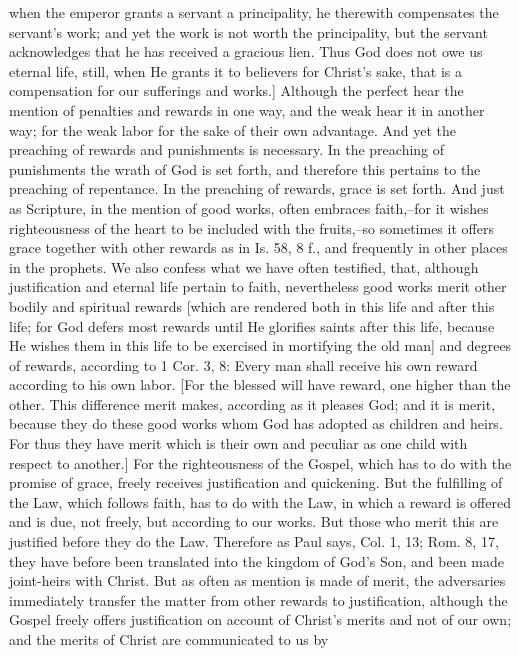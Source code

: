 when the emperor grants a servant a principality, he therewith
compensates the servant's work; and yet the work is not worth the
principality, but the servant acknowledges that he has received a
gracious lien.  Thus God does not owe us eternal life, still, when He
grants it to believers for Christ's sake, that is a compensation for
our sufferings and works.] Although the perfect hear the mention of
penalties and rewards in one way, and the weak hear it in another way;
for the weak labor for the sake of their own advantage.  And yet the
preaching of rewards and punishments is necessary.  In the preaching
of punishments the wrath of God is set forth, and therefore this
pertains to the preaching of repentance.  In the preaching of rewards,
grace is set forth.  And just as Scripture, in the mention of good
works, often embraces faith,--for it wishes righteousness of the
heart to be included with the fruits,--so sometimes it offers grace
together with other rewards as in Is. 58, 8 f., and frequently in
other places in the prophets.  We also confess what we have often
testified, that, although justification and eternal life pertain to
faith, nevertheless good works merit other bodily and spiritual
rewards [which are rendered both in this life and after this life;
for God defers most rewards until He glorifies saints after this life,
because He wishes them in this life to be exercised in mortifying
the old man] and degrees of rewards, according to 1 Cor. 3, 8: Every
man shall receive his own reward according to his own labor.  [For
the blessed will have reward, one higher than the other.  This
difference merit makes, according as it pleases God; and it is merit,
because they do these good works whom God has adopted as children and
heirs.  For thus they have merit which is their own and peculiar as
one child with respect to another.] For the righteousness of the
Gospel, which has to do with the promise of grace, freely receives
justification and quickening.  But the fulfilling of the Law, which
follows faith, has to do with the Law, in which a reward is offered
and is due, not freely, but according to our works.  But those who
merit this are justified before they do the Law.  Therefore as Paul
says, Col. 1, 13; Rom. 8, 17, they have before been translated into
the kingdom of God's Son, and been made joint-heirs with Christ.  But
as often as mention is made of merit, the adversaries immediately
transfer the matter from other rewards to justification, although the
Gospel freely offers justification on account of Christ's merits and
not of our own; and the merits of Christ are communicated to us by
